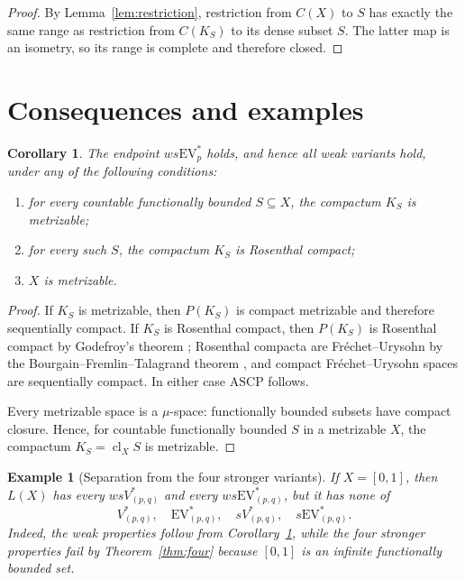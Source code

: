 \documentclass[11pt]{article}
\newtheorem{corollary}[theorem]{Corollary}
\newtheorem{example}[theorem]{Example}
\newcommand{\cl}{\operatorname{cl}}
\newcommand{\EV}{\mathrm{EV}}
\newcommand{\ASCP}{\mathrm{ASCP}}
\begin{document}
\begin{proof}
By Lemma~\ref{lem:restriction}, restriction from $C(X)$ to $S$ has exactly the
same range as restriction from $C(K_S)$ to its dense subset $S$.  The latter
map is an isometry, so its range is complete and therefore closed.
\end{proof}

\section{Consequences and examples}

\begin{corollary}\label{cor:sufficient}
The endpoint $ws\EV^*_p$ holds, and hence all weak variants hold, under any of
the following conditions:
\begin{enumerate}[label=\textup{(\roman*)}]
\item for every countable functionally bounded $S\subseteq X$, the compactum
$K_S$ is metrizable;
\item for every such $S$, the compactum $K_S$ is Rosenthal compact;
\item $X$ is metrizable.
\end{enumerate}
\end{corollary}

\begin{proof}
If $K_S$ is metrizable, then $P(K_S)$ is compact metrizable and therefore
sequentially compact.  If $K_S$ is Rosenthal compact, then $P(K_S)$ is
Rosenthal compact by Godefroy's theorem \cite{Godefroy1980}; Rosenthal compacta
are Fr\'echet--Urysohn by the Bourgain--Fremlin--Talagrand theorem
\cite{BFT1978}, and compact Fr\'echet--Urysohn spaces are sequentially compact.
In either case $\ASCP$ follows.

Every metrizable space is a $\mu$-space: functionally bounded subsets have
compact closure.  Hence, for countable functionally bounded $S$ in a metrizable
$X$, the compactum $K_S=\cl_XS$ is metrizable.
\end{proof}

\begin{example}[Separation from the four stronger variants]
If $X=[0,1]$, then $L(X)$ has every $wsV^*_{(p,q)}$ and every
$ws\EV^*_{(p,q)}$, but it has none of
\[
  V^*_{(p,q)},\quad \EV^*_{(p,q)},\quad
  sV^*_{(p,q)},\quad s\EV^*_{(p,q)}.
\]
Indeed, the weak properties follow from Corollary~\ref{cor:sufficient}, while
the four stronger properties fail by Theorem~\ref{thm:four} because $[0,1]$ is
an infinite functionally bounded set.
\end{example}
\end{document}
